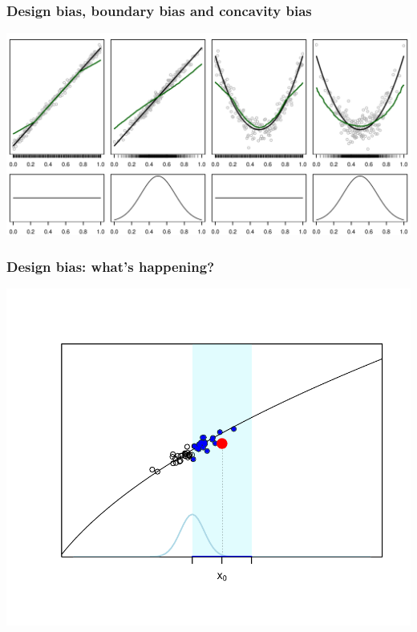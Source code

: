 \documentclass[pdf]{beamer}\usepackage[]{graphicx}\usepackage[]{color}
\makeatletter
\def\maxwidth{ %
  \ifdim\Gin@nat@width>\linewidth
    \linewidth
  \else
    \Gin@nat@width
  \fi
}
\newenvironment{knitrout}{}{} %
\makeatother
\begin{document}
\begin{frame}
\frametitle{Design bias, boundary bias and concavity bias}

\begin{knitrout}
\color{fgcolor}

{\centering \includegraphics[width=\maxwidth]{figure/nw_bias-1} 

}



\end{knitrout}



\end{frame}

\begin{frame}
\frametitle{Design bias: what's happening?}

\begin{knitrout}
\color{fgcolor}

{\centering \includegraphics[width=\textwidth]{figure/designBias-1} 

}



\end{knitrout}

\end{frame}
\end{document}
